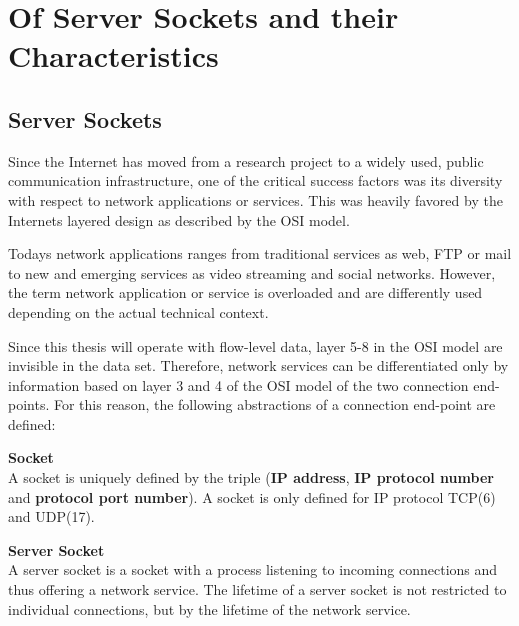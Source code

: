 

\chapter{Of Server Sockets and their Characteristics 
\label{chapter:sockets}}

\section{Server Sockets} Since the Internet has moved from a research project to a widely used, public communication infrastructure, one of the critical success factors was its diversity with respect to network applications or services. This was heavily favored by the Internets layered design as described by the OSI model. 

Todays network applications ranges from traditional services as web, \gls{FTP} or mail to new and emerging services as video streaming and social networks. However, the term network application or service is overloaded and are differently used depending on the actual technical context.

Since this thesis will operate with flow-level data, layer 5-8 in the OSI model are invisible in the data set. Therefore, network services can be differentiated only by information based on layer 3 and 4 of the OSI model of the two connection end-points. For this reason, the following abstractions of a connection end-point are defined:

\parbox{ 
\textwidth}{ 
\begin{defn}
	{\textbf{Socket}\\} A socket is uniquely defined by the triple (\textbf{IP address}, \textbf{IP protocol number} and \textbf{protocol port number}). A socket is only defined for IP protocol \gls{TCP}(6) and \gls{UDP}(17). 
\end{defn}
}

\parbox{ 
\textwidth}{ 
\begin{defn}
	{\textbf{Server Socket 
	\label{def:serversocket}}\\} A server socket is a socket with a process listening to incoming connections and thus offering a network service. The lifetime of a server socket is not restricted to individual connections, but by the lifetime of the network service. 
\end{defn}
}

